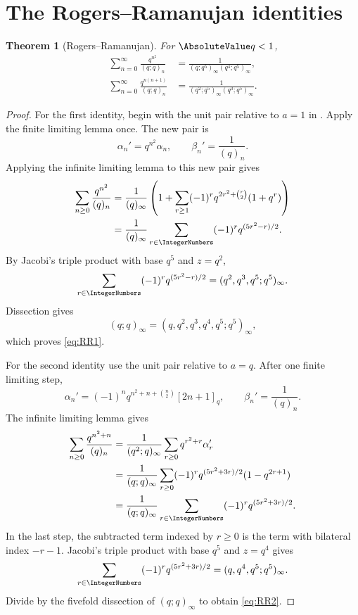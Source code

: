 \documentclass[11pt,a4paper,oneside,openany]{book}
\newtheorem{theorem}{Theorem}[chapter]
\theoremstyle{definition}
\theoremstyle{remark}
\begin{document}
\section{The Rogers--Ramanujan identities}

\begin{theorem}[Rogers--Ramanujan]\label{thm:rogers-ramanujan}
For $\AbsoluteValue q<1$,
\begin{align}
 \sum_{n=0}^{\infty}\frac{q^{n^2}}{(q;q)_n}
 &=\frac1{(q;q^5)_\infty(q^4;q^5)_\infty},\label{eq:RR1}\\
 \sum_{n=0}^{\infty}\frac{q^{n(n+1)}}{(q;q)_n}
 &=\frac1{(q^2;q^5)_\infty(q^3;q^5)_\infty}.
 \label{eq:RR2}
\end{align}
\end{theorem}

\begin{proof}
For the first identity, begin with the unit pair relative to $a=1$ in .  Apply the finite limiting lemma once.  The new pair is
\[
 \alpha_n'=q^{n^2}\alpha_n,
 \qquad
 \beta_n'=\frac1{(q)_n}.
\]  Applying the infinite limiting lemma to this new pair gives
\begin{align*}
 \sum_{n\ge0}\frac{q^{n^2}}{(q)_n}
 &=\frac1{(q)_\infty}
 \left(1+\sum_{r\ge1}(-1)^r
 q^{2r^2+\binom r2}(1+q^r)\right)\\
 &=\frac1{(q)_\infty}
 \sum_{r\in\IntegerNumbers}(-1)^rq^{(5r^2-r)/2}.
\end{align*}
By Jacobi's triple product with base $q^5$ and $z=q^2$,
\[
 \sum_{r\in\IntegerNumbers}(-1)^rq^{(5r^2-r)/2}
 =(q^2,q^3,q^5;q^5)_\infty.
\]
Dissection gives
\[
 (q;q)_\infty=(q,q^2,q^3,q^4,q^5;q^5)_\infty,
\]
which proves \eqref{eq:RR1}.

For the second identity use the unit pair relative to $a=q$.  After one finite limiting step,
\[
 \alpha_n'=(-1)^nq^{n^2+n+\binom n2}[2n+1]_q,
 \qquad
 \beta_n'=\frac1{(q)_n}.
\]
The infinite limiting lemma gives
\begin{align*}
 \sum_{n\ge0}\frac{q^{n^2+n}}{(q)_n}
 &=\frac1{(q^2;q)_\infty}
 \sum_{r\ge0}q^{r^2+r}\alpha_r'\\
 &=\frac1{(q;q)_\infty}
 \sum_{r\ge0}(-1)^rq^{(5r^2+3r)/2}(1-q^{2r+1})\\
 &=\frac1{(q;q)_\infty}
 \sum_{r\in\IntegerNumbers}(-1)^rq^{(5r^2+3r)/2}.
\end{align*}
In the last step, the subtracted term indexed by $r\ge0$ is the term with bilateral index $-r-1$.  Jacobi's triple product with base $q^5$ and $z=q^4$ gives
\[
 \sum_{r\in\IntegerNumbers}(-1)^rq^{(5r^2+3r)/2}
 =(q,q^4,q^5;q^5)_\infty.
\]
Divide by the fivefold dissection of $(q;q)_\infty$ to obtain \eqref{eq:RR2}.
\end{proof}
\end{document}
